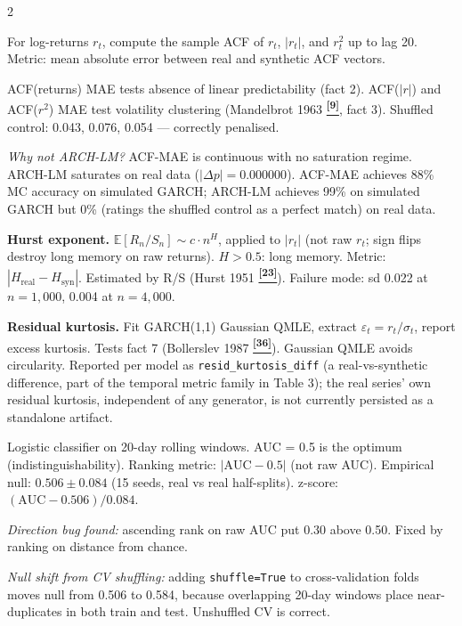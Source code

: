 \documentclass[10pt]{article}
\newcommand{\navybox}[2]{\begin{tcolorbox}[mybox={Navy}{LBg},title={#1}]#2\end{tcolorbox}}
\newcommand{\tealbox}[2]{\begin{tcolorbox}[mybox={Teal}{LBg},title={#1}]#2\end{tcolorbox}}
\newcommand{\purplebox}[2]{\begin{tcolorbox}[mybox={Purple}{LBg},title={#1}]#2\end{tcolorbox}}
\newcommand{\tcite}[1]{%
  \hyperlink{R:#1}{\textsuperscript{\scriptsize\textbf{[#1]}}}}
\newcommand{\E}{\mathbb{E}}
\begin{document}
\begin{multicols}{2}
\columnbreak

\purplebox{Temporal Group: ACF-MAE Triple}{%
For log-returns $r_t$, compute the sample ACF of $r_t$, $|r_t|$, and $r_t^2$ up to lag 20. Metric: mean absolute error between real and synthetic ACF vectors.

ACF(returns) MAE tests absence of linear predictability (fact 2). ACF($|r|$) and ACF($r^2$) MAE test volatility clustering (Mandelbrot 1963\tcite{9}, fact 3). Shuffled control: 0.043, 0.076, 0.054 --- correctly penalised.

\textit{Why not ARCH-LM?} ACF-MAE is continuous with no saturation regime. ARCH-LM saturates on real data ($|\Delta p| = 0.000000$). ACF-MAE achieves 88\% MC accuracy on simulated GARCH; ARCH-LM achieves 99\% on simulated GARCH but 0\% (ratings the shuffled control as a perfect match) on real data.}

\navybox{Temporal Group: Hurst and Residual Kurtosis}{%
\textbf{Hurst exponent.} $\E[R_n/S_n] \sim c\cdot n^H$, applied to $|r_t|$ (not raw $r_t$; sign flips destroy long memory on raw returns). $H>0.5$: long memory. Metric: $|H_\text{real} - H_\text{syn}|$. Estimated by R/S (Hurst 1951\tcite{23}). Failure mode: sd 0.022 at $n=1{,}000$, 0.004 at $n=4{,}000$.

\textbf{Residual kurtosis.} Fit GARCH(1,1) Gaussian QMLE, extract $\varepsilon_t = r_t/\sigma_t$, report excess kurtosis. Tests fact 7 (Bollerslev 1987\tcite{36}). Gaussian QMLE avoids circularity. Reported per model as \texttt{resid\_kurtosis\_diff} (a real-vs-synthetic difference, part of the temporal metric family in Table 3); the real series' own residual kurtosis, independent of any generator, is not currently persisted as a standalone artifact.}

\tealbox{Temporal Group: Discriminative AUC}{%
Logistic classifier on 20-day rolling windows. AUC = 0.5 is the optimum (indistinguishability). Ranking metric: $|\text{AUC} - 0.5|$ (not raw AUC). Empirical null: $0.506 \pm 0.084$ (15 seeds, real vs real half-splits). z-score: $(\text{AUC} - 0.506)/0.084$.

\textit{Direction bug found:} ascending rank on raw AUC put 0.30 above 0.50. Fixed by ranking on distance from chance.

\textit{Null shift from CV shuffling:} adding \texttt{shuffle=True} to cross-validation folds moves null from 0.506 to 0.584, because overlapping 20-day windows place near-duplicates in both train and test. Unshuffled CV is correct.}

\end{multicols}
\end{document}

